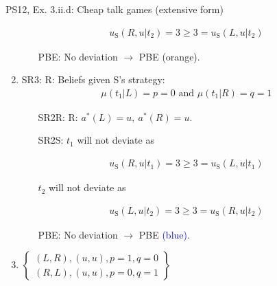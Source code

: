 \begin{frame}{PS12, Ex. 3.ii.d: Cheap talk games (extensive form)}
\begin{multicols}{2}
\begin{enumerate}
\begin{itemize}
        \end{itemize}\vspace{-10pt}
        \begin{align*}
          u_\text{S}(R,u|t_2)=3\geq3=u_\text{S}(L,u|t_2)
        \end{align*}\vspace{-18pt}
        \begin{itemize}\normalsize
          \item[PBE:] No deviation $\rightarrow$ PBE \textcolor{YellowOrange}{(orange)}.
        \end{itemize}
        \item SR3: R: Beliefs given S's strategy:\vspace{-8pt}
        \begin{align*}
          \mu(t_1|L)=p=0\text{ and }\mu(t_1|R)=q=1
        \end{align*}\vspace{-18pt}
        \begin{itemize}\normalsize
          \item[SR2R:] R: $a^*(L)=u,\ a^*(R)=u$.
          \item[SR2S:] $t_1$ will not deviate as
        \end{itemize}\vspace{-10pt}
        \begin{align*}
          u_\text{S}(R,u|t_1)=3\geq 3=u_\text{S}(L,u|t_1)
        \end{align*}\vspace{-18pt}
        \begin{itemize}\normalsize
          \item[] $t_2$ will not deviate as
        \end{itemize}\vspace{-10pt}
        \begin{align*}
          u_\text{S}(L,u|t_2)=3\geq3=u_\text{S}(R,u|t_2)
        \end{align*}\vspace{-18pt}
        \begin{itemize}\normalsize
          \item[PBE:] No deviation $\rightarrow$ PBE \textcolor{blue}{(blue)}.
        \end{itemize}
        \item $\left\{\begin{array}{c}
            (L,R),(u,u),p=1,q=0\\
            (R,L),(u,u),p=0,q=1\end{array}\right\}$
      \end{enumerate}
      \vfill\null
    \end{multicols}
\end{frame}
